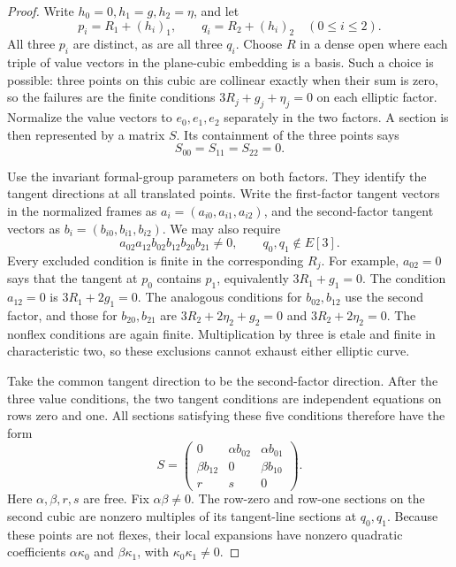 \begin{proof}
Write $h_0=0,h_1=g,h_2=\eta$, and let
\[
                    p_i=R_1+(h_i)_1,\qquad
                    q_i=R_2+(h_i)_2
                    \quad(0\le i\le2).
\]
All three $p_i$ are distinct, as are all three $q_i$.
Choose $R$ in a dense open where each triple of value vectors
in the plane-cubic embedding is a basis.
Such a choice is possible: three points on this cubic are
collinear exactly when their sum is zero, so the failures are
the finite conditions $3R_j+g_j+\eta_j=0$ on each elliptic factor.
Normalize the value vectors to $e_0,e_1,e_2$ separately in the two
factors.  A section is then represented by a matrix $S$.
Its containment of the three points says
\[
                             S_{00}=S_{11}=S_{22}=0.
\]

Use the invariant formal-group parameters on both factors.
They identify the tangent directions at all translated points.
Write the first-factor tangent vectors in the normalized frames as
$a_i=(a_{i0},a_{i1},a_{i2})$, and the second-factor tangent vectors
as $b_i=(b_{i0},b_{i1},b_{i2})$.
We may also require
\[
             a_{02}a_{12}b_{02}b_{12}b_{20}b_{21}\ne0,
             \qquad q_0,q_1\notin E[3].
\]
Every excluded condition is finite in the corresponding $R_j$.
For example, $a_{02}=0$ says that the tangent at $p_0$ contains
$p_1$, equivalently $3R_1+g_1=0$.
The condition $a_{12}=0$ is $3R_1+2g_1=0$.
The analogous conditions for $b_{02},b_{12}$ use the second
factor, and those for $b_{20},b_{21}$ are
$3R_2+2\eta_2+g_2=0$ and $3R_2+2\eta_2=0$.
The nonflex conditions are again finite.  Multiplication by three
is etale and finite in characteristic two, so these exclusions
cannot exhaust either elliptic curve.

Take the common tangent direction to be the second-factor direction.
After the three value conditions, the two tangent conditions
are independent equations on rows zero and one.
All sections satisfying these five conditions therefore have the
form
\[
 S=
 \begin{pmatrix}
       0&\alpha b_{02}&\alpha b_{01}\\
       \beta b_{12}&0&\beta b_{10}\\
       r&s&0
 \end{pmatrix}.
\]
Here $\alpha,\beta,r,s$ are free.  Fix $\alpha\beta\ne0$.
The row-zero and row-one sections on the second cubic are
nonzero multiples of its tangent-line sections at $q_0,q_1$.
Because these points are not flexes, their local expansions have
nonzero quadratic coefficients $\alpha\kappa_0$ and
$\beta\kappa_1$, with $\kappa_0\kappa_1\ne0$.


\end{proof}
